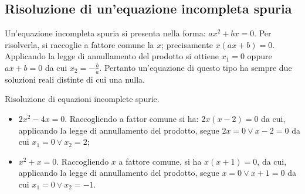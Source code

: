 \subsection{Risoluzione di un'equazione incompleta spuria}
Un'equazione incompleta spuria si presenta nella forma: $a x ^{2 } + b x = 0$.
Per risolverla, si raccoglie a fattore comune la
$x$; precisamente $x ( a x + b ) = 0$.
Applicando la legge di annullamento del prodotto si ottiene
$x_{1} = 0$ oppure $ax + b = 0$ da cui $x_{2} = - \frac{b}{a}$.
Pertanto un'equazione di questo tipo ha sempre due soluzioni reali distinte di cui una nulla.
\begin{exrig}
\begin{esempio}
Risoluzione di equazioni incomplete spurie.
\begin{itemize}
\item $2 x^{2} - 4 x = 0$. Raccogliendo a fattor comune si ha: $2 x ( x - 2 ) = 0$ da cui, applicando la legge di annullamento del prodotto, segue $2x = 0 \vee x - 2 = 0$ da cui $x_{1} = 0 \vee x_{2} = 2$;
\item $x ^{2 } + x = 0$. Raccogliendo $x$ a fattore comune, si ha $x ( x + 1 ) = 0$, da cui, applicando la legge di annullamento del prodotto, segue $x = 0 \vee x + 1 = 0$ da cui $x_{1} = 0 \vee x_{2} = - 1$.
\end{itemize}
\end{esempio}
\end{exrig}
\vspazio\ovalbox{\risolvii \ref{ese:3.5}, \ref{ese:3.6}, \ref{ese:3.7}, \ref{ese:3.8}, \ref{ese:3.9}, \ref{ese:3.10}, \ref{ese:3.11}}

